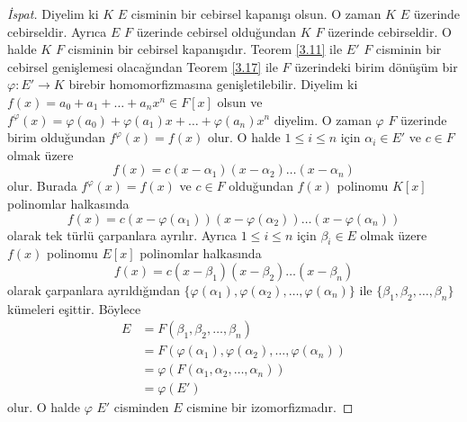 \documentclass{article}
\theoremstyle{definition}
\theoremstyle{remark}
\begin{document}
    		\begin{proof}[İspat]
    	        Diyelim ki $K$ $E$ cisminin bir cebirsel kapanışı olsun. O zaman $K$ $E$ üzerinde cebirseldir. Ayrıca $E$ $F$ üzerinde cebirsel olduğundan $K$ $F$ üzerinde cebirseldir. O halde $K$ $F$ cisminin bir cebirsel kapanışıdır. Teorem \ref{3.11} ile $E'$ $F$ cisminin bir cebirsel genişlemesi olacağından Teorem \ref{3.17} ile $F$ üzerindeki birim dönüşüm bir $\varphi: E' \to K$ birebir homomorfizmasına genişletilebilir. Diyelim ki $f(x) = a_0 + a_1 + \dots + a_nx^n \in F[x]$ olsun ve $f^\varphi(x) = \varphi(a_0) + \varphi(a_1)x + \dots + \varphi(a_n)x^n$ diyelim. O zaman $\varphi$ $F$ üzerinde birim olduğundan $f^\varphi(x) = f(x)$ olur. O halde $1 \leq i \leq n$ için $\alpha_i \in E'$ ve $c \in F$ olmak üzere
    	        \begin{equation*}
    	            f(x) = c (x - \alpha_1) (x - \alpha_2) \dots (x - \alpha_n)
    	        \end{equation*}
    	        olur. Burada $f^\varphi(x) = f(x)$ ve $c \in F$ olduğundan $f(x)$ polinomu $K[x]$ polinomlar halkasında
    	        \begin{equation*}
    	            f(x) = c (x - \varphi(\alpha_1)) (x - \varphi(\alpha_2)) \dots (x - \varphi(\alpha_n))
    	        \end{equation*}
    	        olarak tek türlü çarpanlara ayrılır. Ayrıca $1 \leq i \leq n$ için $\beta_i \in E$ olmak üzere $f(x)$ polinomu $E[x]$ polinomlar halkasında
    	        \begin{equation*}
    	            f(x) = c (x - \beta_1) (x - \beta_2) \dots (x - \beta_n)
    	        \end{equation*}
    	        olarak çarpanlara ayrıldığından $\{\varphi(\alpha_1), \varphi(\alpha_2), \dots, \varphi(\alpha_n)\}$ ile $\{\beta_1, \beta_2, \dots, \beta_n\}$ kümeleri eşittir. Böylece
    	        \begin{align*}
    	            E &= F(\beta_1, \beta_2, \dots, \beta_n)\\
    	            &= F(\varphi(\alpha_1), \varphi(\alpha_2), \dots, \varphi(\alpha_n))\\\
    	            &= \varphi(F(\alpha_1, \alpha_2, \dots, \alpha_n))\\
    	            &= \varphi(E')
    	        \end{align*}
    	        olur. O halde $\varphi$ $E'$ cisminden $E$ cismine bir izomorfizmadır.
    	    \end{proof}
	        
\end{document}
